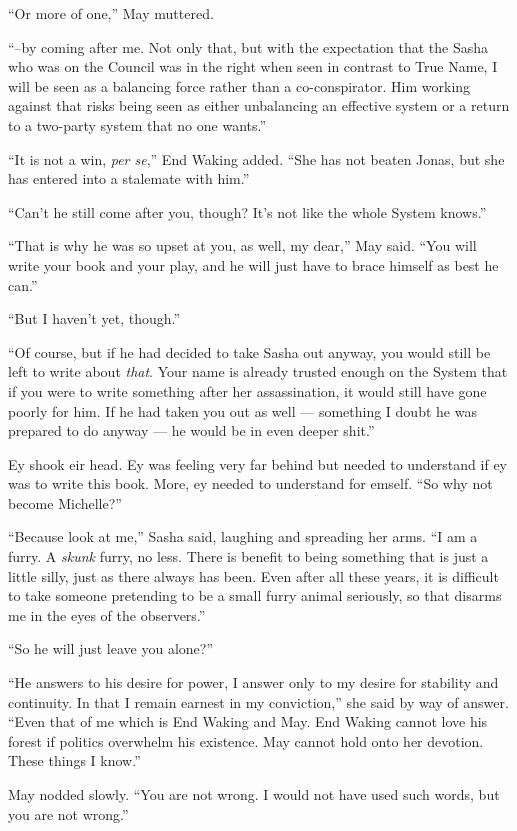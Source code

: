 ``Or more of one,'' May muttered.

``--by coming after me. Not only that, but with the expectation that the Sasha who was on the Council was in the right when seen in contrast to True Name, I will be seen as a balancing force rather than a co-conspirator. Him working against that risks being seen as either unbalancing an effective system or a return to a two-party system that no one wants.''

``It is not a win, \emph{per se},'' End Waking added. ``She has not beaten Jonas, but she has entered into a stalemate with him.''

``Can't he still come after you, though? It's not like the whole System knows.''

``That is why he was so upset at you, as well, my dear,'' May said. ``You will write your book and your play, and he will just have to brace himself as best he can.''

``But I haven't yet, though.''

``Of course, but if he had decided to take Sasha out anyway, you would still be left to write about \emph{that}. Your name is already trusted enough on the System that if you were to write something after her assassination, it would still have gone poorly for him. If he had taken you out as well — something I doubt he was prepared to do anyway — he would be in even deeper shit.''

Ey shook eir head. Ey was feeling very far behind but needed to understand if ey was to write this book. More, ey needed to understand for emself. ``So why not become Michelle?''

``Because look at me,'' Sasha said, laughing and spreading her arms. ``I am a furry. A \emph{skunk} furry, no less. There is benefit to being something that is just a little silly, just as there always has been. Even after all these years, it is difficult to take someone pretending to be a small furry animal seriously, so that disarms me in the eyes of the observers.''

``So he will just leave you alone?''

``He answers to his desire for power, I answer only to my desire for stability and continuity. In that I remain earnest in my conviction,'' she said by way of answer. ``Even that of me which is End Waking and May. End Waking cannot love his forest if politics overwhelm his existence. May cannot hold onto her devotion. These things I know.''

May nodded slowly. ``You are not wrong. I would not have used such words, but you are not wrong.''

